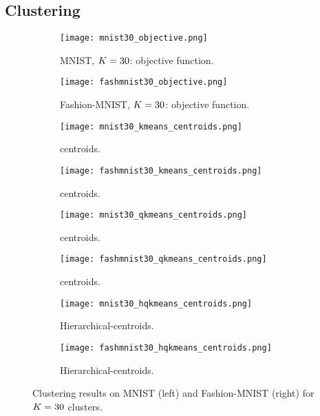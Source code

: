 
\subsection{Clustering}

\begin{figure*}
\begin{subfigure}[b]{.49\textwidth}
\texttt{[image: mnist30\_objective.png]}
\caption{MNIST, $K=30$: objective function.}
\label{fig:mnist:objfun}
\end{subfigure}
\begin{subfigure}[b]{.49\textwidth}
\texttt{[image: fashmnist30\_objective.png]}
\caption{Fashion-MNIST, $K=30$: objective function.}
\label{fig:fmnist:objfun}
\end{subfigure}
\begin{subfigure}[t]{.49\textwidth}
\texttt{[image: mnist30\_kmeans\_centroids.png]}
\caption{\kmeans centroids.}
\label{fig:mnist:kmeans:centroids}
\end{subfigure}
\begin{subfigure}[t]{.49\textwidth}
\texttt{[image: fashmnist30\_kmeans\_centroids.png]}
\caption{\kmeans centroids.}
\label{fig:fmnist:kmeans:centroids}
\end{subfigure}
\begin{subfigure}[t]{.49\textwidth}
\texttt{[image: mnist30\_qkmeans\_centroids.png]}
\caption{\qkmeans centroids.}
\label{fig:mnist:qkmeans:centroids}
\end{subfigure}
\begin{subfigure}[t]{.49\textwidth}
\texttt{[image: fashmnist30\_qkmeans\_centroids.png]}
\caption{\qkmeans centroids.}
\label{fig:fmnist:qkmeans:centroids}
\end{subfigure}
\begin{subfigure}[t]{.49\textwidth}
\texttt{[image: mnist30\_hqkmeans\_centroids.png]}
\caption{Hierarchical-\palm \qkmeans centroids.}
\label{fig:mnist:hqkmeans:centroids}
\end{subfigure}
\begin{subfigure}[t]{.49\textwidth}
\texttt{[image: fashmnist30\_hqkmeans\_centroids.png]}
\caption{Hierarchical-\palm \qkmeans centroids.}
\label{fig:fmnist:hqkmeans:centroids}
\end{subfigure}
\caption{Clustering results on MNIST (left) and Fashion-MNIST (right) for $K=30$ clusters.}
\label{fig:clustering:realdata}
\end{figure*}

